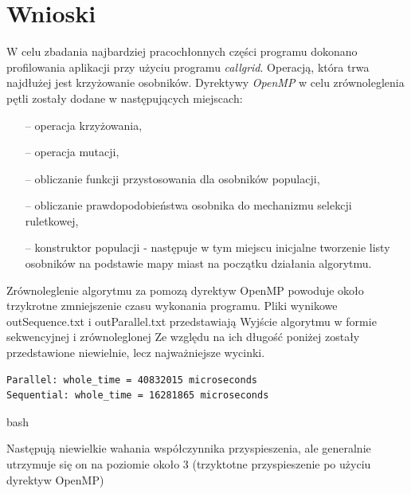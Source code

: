 \documentclass[10pt,a4paper]{article}
\begin{document}
\pagebreak
\section{Wnioski}
W celu zbadania najbardziej pracochłonnych części programu dokonano profilowania aplikacji przy użyciu programu \textit{callgrid}. Operacją, która trwa najdłużej jest krzyżowanie osobników. Dyrektywy \textit{OpenMP} w celu zrównoleglenia pętli zostały dodane w następujących miejscach:
\begin{itemize}
\item[--] operacja krzyżowania,
\item[--] operacja mutacji,
\item[--] obliczanie funkcji przystosowania dla osobników populacji,
\item[--] obliczanie prawdopodobieństwa osobnika do mechanizmu selekcji ruletkowej,
\item[--] konstruktor populacji - następuje w tym miejscu inicjalne tworzenie listy osobników na podstawie mapy miast na początku działania algorytmu.
\end{itemize}

Zrównoleglenie algorytmu za pomozą dyrektyw OpenMP powoduje około trzykrotne zmniejszenie czasu wykonania programu. Pliki wynikowe outSequence.txt i outParallel.txt przedstawiają Wyjście algorytmu w formie sekwencyjnej i zrównoleglonej Ze względu na ich długość poniżej zostały przedstawione niewielnie, lecz najważniejsze wycinki.

\begin{verbatim}
Parallel: whole_time = 40832015 microseconds
Sequential: whole_time = 16281865 microseconds
\end{verbatim}{bash}

Następują niewielkie wahania współczynnika przyspieszenia, ale generalnie utrzymuje się on na poziomie około 3 (trzyktotne przyspieszenie po użyciu dyrektyw OpenMP)
\end{document}

